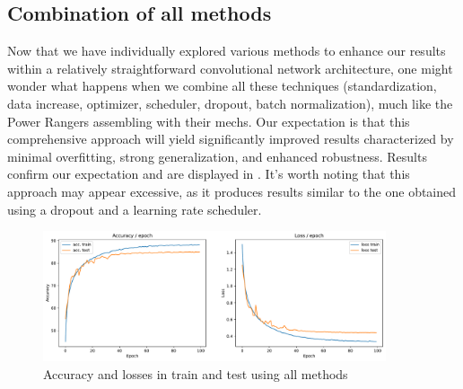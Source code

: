 \subsection{Combination of all methods}
Now that we have individually explored various methods to enhance our results within a relatively straightforward convolutional network architecture, one might wonder what happens when we combine all these techniques (standardization, data increase, optimizer, scheduler, dropout, batch normalization), much like the Power Rangers assembling with their mechs. Our expectation is that this comprehensive approach will yield significantly improved results characterized by minimal overfitting, strong generalization, and enhanced robustness. Results confirm our expectation and are displayed in . It's worth noting that this approach may appear excessive, as it produces results similar to the one obtained using a dropout and a learning rate scheduler.

\begin{figure}[H]
    \centering
    \includegraphics*[width=0.9\textwidth]{figs/CNN/combined.pdf}
    \caption{Accuracy and losses in train and test using all methods}
    \label{fig:combined}
\end{figure}

